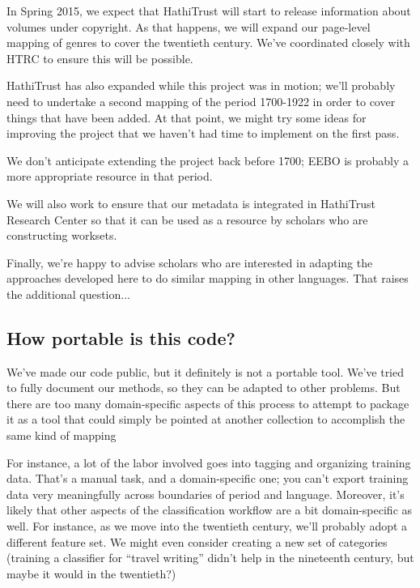 \documentclass[paper=a4, fontsize=12pt]{scrartcl}
\numberwithin{equation}{section}		%
\numberwithin{figure}{section}			%
\numberwithin{table}{section}				%
\begin{document}
In Spring 2015, we expect that HathiTrust will start to release information about volumes under copyright. As that happens, we will expand our page-level mapping of genres to cover the twentieth century. We've coordinated closely with HTRC to ensure this will be possible.

HathiTrust has also expanded while this project was in motion; we'll probably need to undertake a second mapping of the period 1700-1922 in order to cover things that have been added. At that point, we might try some ideas for improving the project that we haven't had time to implement on the first pass. 

We don't anticipate extending the project back before 1700; EEBO is probably a more appropriate resource in that period.

We will also work to ensure that our metadata is integrated in HathiTrust Research Center so that it can be used as a resource by scholars who are constructing worksets.

Finally, we're happy to advise scholars who are interested in adapting the approaches developed here to do similar mapping in other languages. That raises the additional question...

\subsection{How portable is this code?}

We've made our code public, but it definitely is not a portable tool. We've tried to fully document our methods, so they can be adapted to other problems. But there are too many domain-specific aspects of this process to attempt to package it as a tool that could simply be pointed at another collection to accomplish the same kind of mapping

For instance, a lot of the labor involved goes into tagging and organizing training data. That's a manual task, and a domain-specific one; you can't export training data very meaningfully across boundaries of period and language. Moreover, it's likely that other aspects of the classification workflow are a bit domain-specific as well. For instance, as we move into the twentieth century, we'll probably adopt a different feature set. We might even consider creating a new set of categories (training a classifier for ``travel writing'' didn't help in the nineteenth century, but maybe it would in the twentieth?)
\end{document}
